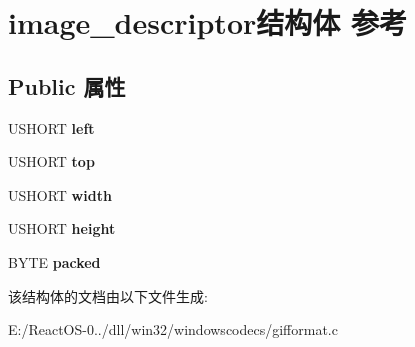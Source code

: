 \hypertarget{structimage__descriptor}{}\section{image\+\_\+descriptor结构体 参考}
\label{structimage__descriptor}
\subsection*{Public 属性}
\begin{DoxyCompactItemize}
\item 
\mbox{\label{structimage__descriptor_a3493e37223d5364f55b0d853f47dd5e8}} 
U\+S\+H\+O\+RT {\bfseries left}
\item 
\mbox{\label{structimage__descriptor_a6ae2c204f8a6c791584f64096ff8238b}} 
U\+S\+H\+O\+RT {\bfseries top}
\item 
\mbox{\label{structimage__descriptor_a1ee003511ecadb57d531854864a8cd8b}} 
U\+S\+H\+O\+RT {\bfseries width}
\item 
\mbox{\label{structimage__descriptor_a71dd3f81216c0f97ef7e84420c7901fb}} 
U\+S\+H\+O\+RT {\bfseries height}
\item 
\mbox{\label{structimage__descriptor_a321b0f4ef898b0e31b9bc96b21aa3238}} 
B\+Y\+TE {\bfseries packed}
\end{DoxyCompactItemize}


该结构体的文档由以下文件生成\+:\begin{DoxyCompactItemize}
\item 
E\+:/\+React\+O\+S-\/0../dll/win32/windowscodecs/gifformat.\+c\end{DoxyCompactItemize}
